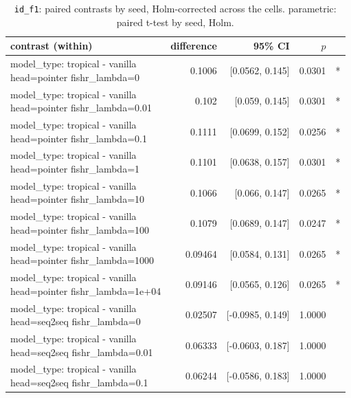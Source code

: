 \documentclass[10pt]{article}
\makeatletter
\newcommand{\stackcell}[1]{\begin{tabular}[t]{@{}l@{}}#1\end{tabular}}
\makeatother
\begin{document}
{\small
\begin{longtable}{lrrrl}
\caption{\texttt{id\_f1}: paired contrasts by seed, Holm-corrected across the cells. parametric: paired t-test by seed, Holm.}\label{tab:paired-id_f1}\\
\toprule
contrast (within) & difference & 95\% CI & $p$ & \\
\midrule
\endhead
\stackcell{model\_type: tropical - vanilla\\\footnotesize head=pointer fishr\_lambda=0 } & 0.1006 & [0.0562, 0.145] & 0.0301 & *\\
\stackcell{model\_type: tropical - vanilla\\\footnotesize head=pointer fishr\_lambda=0.01 } & 0.102 & [0.059, 0.145] & 0.0301 & *\\
\stackcell{model\_type: tropical - vanilla\\\footnotesize head=pointer fishr\_lambda=0.1 } & 0.1111 & [0.0699, 0.152] & 0.0256 & *\\
\stackcell{model\_type: tropical - vanilla\\\footnotesize head=pointer fishr\_lambda=1 } & 0.1101 & [0.0638, 0.157] & 0.0301 & *\\
\stackcell{model\_type: tropical - vanilla\\\footnotesize head=pointer fishr\_lambda=10 } & 0.1066 & [0.066, 0.147] & 0.0265 & *\\
\stackcell{model\_type: tropical - vanilla\\\footnotesize head=pointer fishr\_lambda=100 } & 0.1079 & [0.0689, 0.147] & 0.0247 & *\\
\stackcell{model\_type: tropical - vanilla\\\footnotesize head=pointer fishr\_lambda=1000 } & 0.09464 & [0.0584, 0.131] & 0.0265 & *\\
\stackcell{model\_type: tropical - vanilla\\\footnotesize head=pointer fishr\_lambda=1e+04 } & 0.09146 & [0.0565, 0.126] & 0.0265 & *\\
\stackcell{model\_type: tropical - vanilla\\\footnotesize head=seq2seq fishr\_lambda=0 } & 0.02507 & [-0.0985, 0.149] & 1.0000 & \\
\stackcell{model\_type: tropical - vanilla\\\footnotesize head=seq2seq fishr\_lambda=0.01 } & 0.06333 & [-0.0603, 0.187] & 1.0000 & \\
\stackcell{model\_type: tropical - vanilla\\\footnotesize head=seq2seq fishr\_lambda=0.1 } & 0.06244 & [-0.0586, 0.183] & 1.0000 & \\

\end{longtable}}
\end{document}
